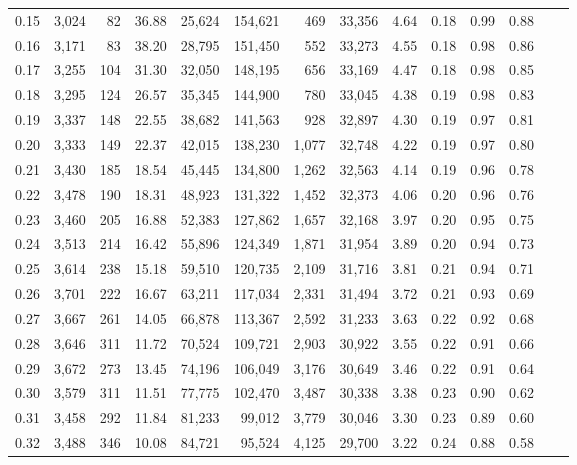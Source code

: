 \begin{tabular}{rrrrrrrrrrrrrr}
0.15 &  3,024 &   82 &   36.88 &   25,624 &  154,621 &     469 &  33,356 &  4.64 &  0.18 &  0.99 &      0.88 \\
0.16 &  3,171 &   83 &   38.20 &   28,795 &  151,450 &     552 &  33,273 &  4.55 &  0.18 &  0.98 &      0.86 \\
0.17 &  3,255 &  104 &   31.30 &   32,050 &  148,195 &     656 &  33,169 &  4.47 &  0.18 &  0.98 &      0.85 \\
0.18 &  3,295 &  124 &   26.57 &   35,345 &  144,900 &     780 &  33,045 &  4.38 &  0.19 &  0.98 &      0.83 \\
0.19 &  3,337 &  148 &   22.55 &   38,682 &  141,563 &     928 &  32,897 &  4.30 &  0.19 &  0.97 &      0.81 \\
0.20 &  3,333 &  149 &   22.37 &   42,015 &  138,230 &   1,077 &  32,748 &  4.22 &  0.19 &  0.97 &      0.80 \\
0.21 &  3,430 &  185 &   18.54 &   45,445 &  134,800 &   1,262 &  32,563 &  4.14 &  0.19 &  0.96 &      0.78 \\
0.22 &  3,478 &  190 &   18.31 &   48,923 &  131,322 &   1,452 &  32,373 &  4.06 &  0.20 &  0.96 &      0.76 \\
0.23 &  3,460 &  205 &   16.88 &   52,383 &  127,862 &   1,657 &  32,168 &  3.97 &  0.20 &  0.95 &      0.75 \\
0.24 &  3,513 &  214 &   16.42 &   55,896 &  124,349 &   1,871 &  31,954 &  3.89 &  0.20 &  0.94 &      0.73 \\
0.25 &  3,614 &  238 &   15.18 &   59,510 &  120,735 &   2,109 &  31,716 &  3.81 &  0.21 &  0.94 &      0.71 \\
0.26 &  3,701 &  222 &   16.67 &   63,211 &  117,034 &   2,331 &  31,494 &  3.72 &  0.21 &  0.93 &      0.69 \\
0.27 &  3,667 &  261 &   14.05 &   66,878 &  113,367 &   2,592 &  31,233 &  3.63 &  0.22 &  0.92 &      0.68 \\
0.28 &  3,646 &  311 &   11.72 &   70,524 &  109,721 &   2,903 &  30,922 &  3.55 &  0.22 &  0.91 &      0.66 \\
0.29 &  3,672 &  273 &   13.45 &   74,196 &  106,049 &   3,176 &  30,649 &  3.46 &  0.22 &  0.91 &      0.64 \\
0.30 &  3,579 &  311 &   11.51 &   77,775 &  102,470 &   3,487 &  30,338 &  3.38 &  0.23 &  0.90 &      0.62 \\
0.31 &  3,458 &  292 &   11.84 &   81,233 &   99,012 &   3,779 &  30,046 &  3.30 &  0.23 &  0.89 &      0.60 \\
0.32 &  3,488 &  346 &   10.08 &   84,721 &   95,524 &   4,125 &  29,700 &  3.22 &  0.24 &  0.88 &      0.58 \\

\end{tabular}
